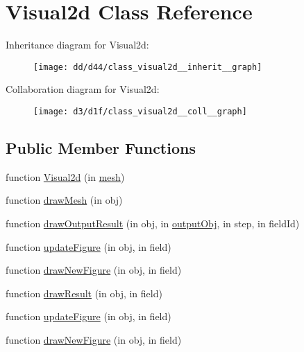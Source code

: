 \hypertarget{class_visual2d}{}\section{Visual2d Class Reference}
\label{class_visual2d}


Inheritance diagram for Visual2d\+:
\nopagebreak
\begin{figure}[H]
\begin{center}
\leavevmode
\texttt{[image: dd/d44/class\_visual2d\_\_inherit\_\_graph]}
\end{center}
\end{figure}


Collaboration diagram for Visual2d\+:
\nopagebreak
\begin{figure}[H]
\begin{center}
\leavevmode
\texttt{[image: d3/d1f/class\_visual2d\_\_coll\_\_graph]}
\end{center}
\end{figure}
\subsection*{Public Member Functions}
\begin{DoxyCompactItemize}
\item 
function \hyperlink{class_visual2d_ab6bbc8d7de69a10e094158681bc564a7}{Visual2d} (in \hyperlink{class_abstract_visual_a8ab1d2da1797dd6cd72205c673336366}{mesh})
\item 
function \hyperlink{class_visual2d_ac472a6b1ea0322f2482e139154e21375}{draw\+Mesh} (in obj)
\item 
function \hyperlink{class_visual2d_a2cc09fe5407622aff1b0bbc7b8abc0ae}{draw\+Output\+Result} (in obj, in \hyperlink{class_abstract_visual_a640d3d439c55d1229b740fd6cdf14309}{output\+Obj}, in step, in field\+Id)
\item 
function \hyperlink{class_visual2d_aec0e088609dc77f7d593c8551a3b6c26}{update\+Figure} (in obj, in field)
\item 
function \hyperlink{class_visual2d_a7eac494d1551f487f6e96f2ae31ffd22}{draw\+New\+Figure} (in obj, in field)
\item 
function \hyperlink{class_visual2d_af12862a4c3432298ca629a45921d2a2e}{draw\+Result} (in obj, in field)
\item 
function \hyperlink{class_visual2d_aec0e088609dc77f7d593c8551a3b6c26}{update\+Figure} (in obj, in field)
\item 
function \hyperlink{class_visual2d_a7eac494d1551f487f6e96f2ae31ffd22}{draw\+New\+Figure} (in obj, in field)
\end{DoxyCompactItemize}
